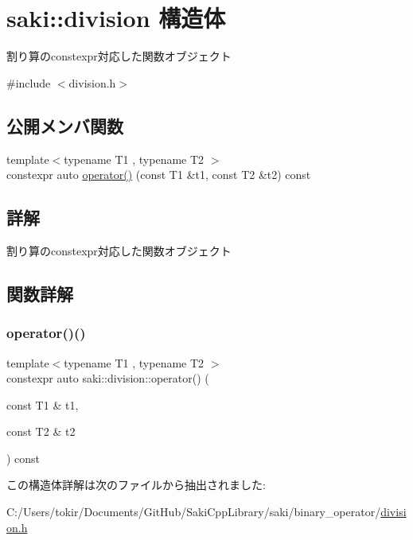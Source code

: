 \hypertarget{structsaki_1_1division}{}\section{saki\+:\+:division 構造体}
\label{structsaki_1_1division}


割り算のconstexpr対応した関数オブジェクト  




{\ttfamily \#include $<$division.\+h$>$}

\subsection*{公開メンバ関数}
\begin{DoxyCompactItemize}
\item 
{\footnotesize template$<$typename T1 , typename T2 $>$ }\\constexpr auto \mbox{\hyperlink{structsaki_1_1division_a4ded7d15a028cf98a5c5f72cf33ddba0}{operator()}} (const T1 \&t1, const T2 \&t2) const
\end{DoxyCompactItemize}


\subsection{詳解}
割り算のconstexpr対応した関数オブジェクト 

\subsection{関数詳解}
\mbox{\label{structsaki_1_1division_a4ded7d15a028cf98a5c5f72cf33ddba0}} 
\subsubsection{\texorpdfstring{operator()()}{operator()()}}
{\footnotesize\ttfamily template$<$typename T1 , typename T2 $>$ \\
constexpr auto saki\+::division\+::operator() (\begin{DoxyParamCaption}\item[{const T1 \&}]{t1,  }\item[{const T2 \&}]{t2 }\end{DoxyParamCaption}) const\hspace{0.3cm}{\ttfamily [inline]}}



この構造体詳解は次のファイルから抽出されました\+:\begin{DoxyCompactItemize}
\item 
C\+:/\+Users/tokir/\+Documents/\+Git\+Hub/\+Saki\+Cpp\+Library/saki/binary\+\_\+operator/\mbox{\hyperlink{division_8h}{division.\+h}}\end{DoxyCompactItemize}

